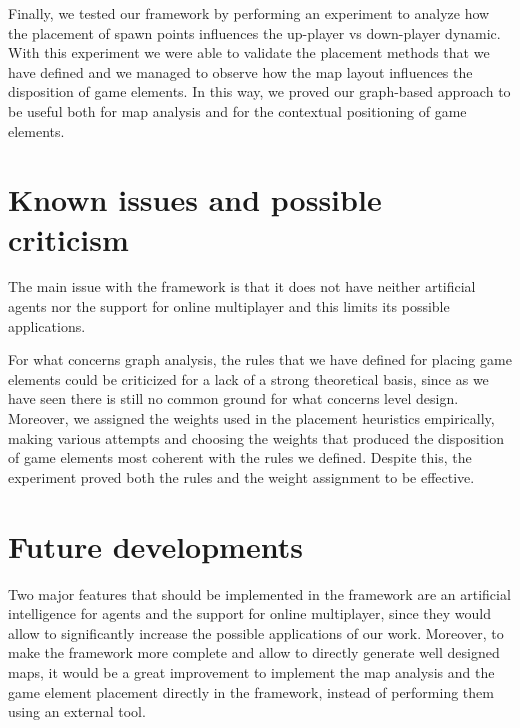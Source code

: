 \par

Finally, we tested our framework by performing an experiment to analyze how the placement of spawn points influences the up-player vs down-player dynamic. With this experiment we were able to validate the placement methods that we have defined and we managed to observe how the map layout influences the disposition of game elements. In this way, we proved our graph-based approach to be useful both for map analysis and for the contextual positioning of game elements.


\section{Known issues and possible criticism}

The main issue with the framework is that it does not have neither artificial agents nor the support for online multiplayer and this limits its possible applications.

\par

For what concerns graph analysis, the rules that we have defined for placing game elements could be criticized for a lack of a strong theoretical basis, since as we have seen there is still no common ground for what concerns level design. Moreover, we assigned the weights used in the placement heuristics empirically, making various attempts and choosing the weights that produced the disposition of game elements most coherent with the rules we defined. Despite this, the experiment proved both the rules and the weight assignment to be effective.


\section{Future developments}

Two major features that should be implemented in the framework are an artificial intelligence for agents and the support for online multiplayer, since they would allow to significantly increase the possible applications of our work. Moreover, to make the framework more complete and allow to directly generate well designed maps, it would be a great improvement to implement the map analysis and the game element placement directly in the framework, instead of performing them using an external tool.

